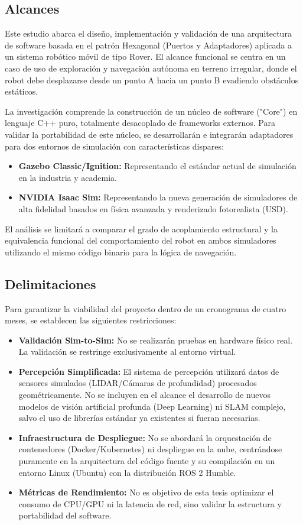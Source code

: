 \subsection{Alcances}

Este estudio abarca el diseño, implementación y validación de una arquitectura de software basada en el patrón Hexagonal (Puertos y Adaptadores) aplicada a un sistema robótico móvil de tipo Rover. El alcance funcional se centra en un caso de uso de exploración y navegación autónoma en terreno irregular, donde el robot debe desplazarse desde un punto A hacia un punto B evadiendo obstáculos estáticos.

La investigación comprende la construcción de un núcleo de software ("Core") en lenguaje C++ puro, totalmente desacoplado de frameworks externos. Para validar la portabilidad de este núcleo, se desarrollarán e integrarán adaptadores para dos entornos de simulación con características dispares: 
\begin{itemize}
    \item \textbf{Gazebo Classic/Ignition:} Representando el estándar actual de simulación en la industria y academia.
    \item \textbf{NVIDIA Isaac Sim:} Representando la nueva generación de simuladores de alta fidelidad basados en física avanzada y renderizado fotorealista (USD).
\end{itemize}

El análisis se limitará a comparar el grado de acoplamiento estructural y la equivalencia funcional del comportamiento del robot en ambos simuladores utilizando el mismo código binario para la lógica de navegación.

\subsection{Delimitaciones}

Para garantizar la viabilidad del proyecto dentro de un cronograma de cuatro meses, se establecen las siguientes restricciones:
\begin{itemize}
    \item \textbf{Validación Sim-to-Sim:} No se realizarán pruebas en hardware físico real. La validación se restringe exclusivamente al entorno virtual.
    \item \textbf{Percepción Simplificada:} El sistema de percepción utilizará datos de sensores simulados (LIDAR/Cámaras de profundidad) procesados geométricamente. No se incluyen en el alcance el desarrollo de nuevos modelos de visión artificial profunda (Deep Learning) ni SLAM complejo, salvo el uso de librerías estándar ya existentes si fueran necesarias.
    \item \textbf{Infraestructura de Despliegue:} No se abordará la orquestación de contenedores (Docker/Kubernetes) ni despliegue en la nube, centrándose puramente en la arquitectura del código fuente y su compilación en un entorno Linux (Ubuntu) con la distribución ROS 2 Humble.
    \item \textbf{Métricas de Rendimiento:} No es objetivo de esta tesis optimizar el consumo de CPU/GPU ni la latencia de red, sino validar la estructura y portabilidad del software.
\end{itemize} 


